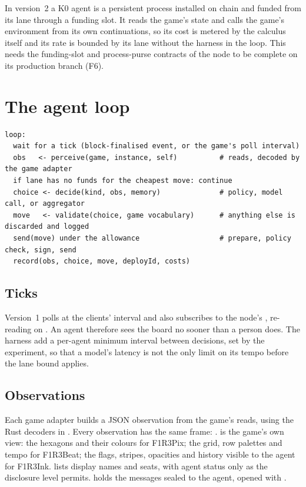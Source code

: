 \documentclass[11pt,a4paper]{article}
\begin{document}
In version~2 a K0 agent is a persistent process installed on chain and funded from its lane through
a funding slot. It reads the game's state and calls the game's environment from its own
continuations, so its cost is metered by the calculus itself and its rate is bounded by its lane
without the harness in the loop. This needs the funding-slot and process-purse contracts of the node
to be complete on its production branch (F6).

\section{The agent loop}\label{sec:loop}

\begin{lstlisting}[language={},caption={The loop each runtime runs, per agent.},captionpos=b]
loop:
  wait for a tick (block-finalised event, or the game's poll interval)
  obs   <- perceive(game, instance, self)          # reads, decoded by the game adapter
  if lane has no funds for the cheapest move: continue
  choice <- decide(kind, obs, memory)              # policy, model call, or aggregator
  move   <- validate(choice, game vocabulary)      # anything else is discarded and logged
  send(move) under the allowance                   # prepare, policy check, sign, send
  record(obs, choice, move, deployId, costs)
\end{lstlisting}

\subsection{Ticks}

Version~1 polls at the clients' interval and also subscribes to the node's ,
re-reading on . An agent therefore sees the board no sooner than a person
does. The harness \MUST{} add a per-agent minimum interval between decisions, set by the experiment,
so that a model's latency is not the only limit on its tempo before the lane bound applies.

\subsection{Observations}

Each game adapter builds a JSON observation from the game's reads, using the Rust decoders in
. Every observation has the same frame:
.  is the
game's own view: the hexagons and their colours for F1R3Pix; the grid, row palettes and tempo for
F1R3Beat; the flags, stripes, opacities and history visible to the agent for F1R3Ink. 
lists display names and seats, with agent status only as the disclosure level permits.
 holds the messages sealed to the agent, opened with .
\end{document}
